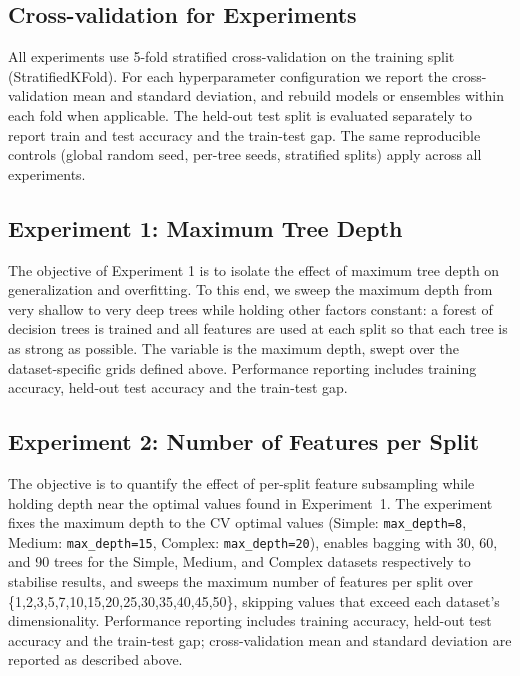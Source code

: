 \documentclass[conference]{IEEEtran}
\begin{document}
\subsection{Cross-validation for Experiments}
All experiments use 5-fold stratified cross-validation on the training split (StratifiedKFold). For each hyperparameter configuration we report the cross-validation mean and standard deviation, and rebuild models or ensembles within each fold when applicable. The held-out test split is evaluated separately to report train and test accuracy and the train-test gap. The same reproducible controls (global random seed, per-tree seeds, stratified splits) apply across all experiments.

\subsection{Experiment 1: Maximum Tree Depth}
The objective of Experiment 1 is to isolate the effect of maximum tree depth on generalization and overfitting. To this end, we sweep the maximum depth from 
very shallow to very deep trees while holding other factors constant: a forest of decision trees is trained and all features are used at 
each split so that each tree is as strong as possible. The variable is the maximum depth, swept over the dataset-specific grids defined above. Performance reporting includes training accuracy, held-out test accuracy and the train-test gap.

\subsection{Experiment 2: Number of Features per Split}
The objective is to quantify the effect of per-split feature subsampling while holding depth near the optimal values found in Experiment~1. The experiment fixes the maximum depth to 
the CV optimal values (Simple: \texttt{max\_depth=8}, Medium: \texttt{max\_depth=15}, Complex: \texttt{max\_depth=20}), enables bagging with 30, 60, and 90 trees for the Simple, Medium, 
and Complex datasets respectively to stabilise results, and sweeps the maximum number of features per split over \{1,2,3,5,7,10,15,20,25,30,35,40,45,50\}, skipping values that 
exceed each dataset's dimensionality. Performance reporting includes training accuracy, held-out test accuracy and the train-test gap; cross-validation mean and standard deviation are reported as described above.
\end{document}
